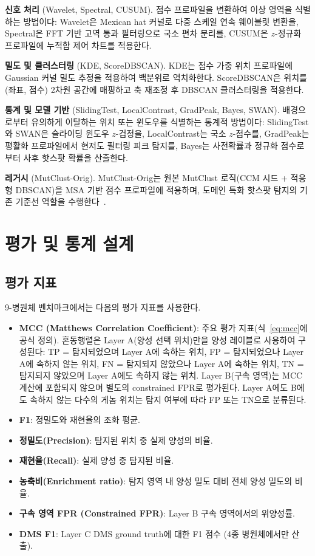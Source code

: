 \textbf{신호 처리} (Wavelet, Spectral, CUSUM).
점수 프로파일을 변환하여 이상 영역을 식별하는 방법이다: Wavelet은 Mexican hat 커널로 다중 스케일 연속 웨이블릿 변환을, Spectral은 FFT 기반 고역 통과 필터링으로 국소 편차 분리를, CUSUM은 $z$-정규화 프로파일에 누적합 제어 차트를 적용한다.

\textbf{밀도 및 클러스터링} (KDE, ScoreDBSCAN).
KDE는 점수 가중 위치 프로파일에 Gaussian 커널 밀도 추정을 적용하여 백분위로 역치화한다. ScoreDBSCAN은 위치를 (좌표, 점수) 2차원 공간에 매핑하고 축 재조정 후 DBSCAN 클러스터링을 적용한다.

\textbf{통계 및 모델 기반} (SlidingTest, LocalContrast, GradPeak, Bayes, SWAN).
배경으로부터 유의하게 이탈하는 위치 또는 윈도우를 식별하는 통계적 방법이다: SlidingTest와 SWAN은 슬라이딩 윈도우 $z$-검정을, LocalContrast는 국소 $z$-점수를, GradPeak는 평활화 프로파일에서 현저도 필터링 피크 탐지를, Bayes는 사전확률과 정규화 점수로부터 사후 핫스팟 확률을 산출한다.

\textbf{레거시} (MutClust-Orig).
MutClust-Orig는 원본 MutClust 로직(CCM 시드 + 적응형 DBSCAN)을 MSA 기반 점수 프로파일에 적용하며, 도메인 특화 핫스팟 탐지의 기존 기준선 역할을 수행한다~\cite{youn2025mutclust}.

\section{평가 및 통계 설계}
\label{sec:eval_stat_design_kr}

\subsection{평가 지표}
\label{subsec:9pathogen_metrics}

9-병원체 벤치마크에서는 다음의 평가 지표를 사용한다.

\begin{itemize}
\item \textbf{MCC (Matthews Correlation Coefficient)}: 주요 평가 지표(식~\ref{eq:mcc}에 공식 정의).
혼동행렬은 Layer A(양성 선택 위치)만을 양성 레이블로 사용하여 구성된다: TP = 탐지되었으며 Layer A에 속하는 위치, FP = 탐지되었으나 Layer A에 속하지 않는 위치, FN = 탐지되지 않았으나 Layer A에 속하는 위치, TN = 탐지되지 않았으며 Layer A에도 속하지 않는 위치.
Layer B(구속 영역)는 MCC 계산에 포함되지 않으며 별도의 constrained FPR로 평가된다. Layer A에도 B에도 속하지 않는 다수의 게놈 위치는 탐지 여부에 따라 FP 또는 TN으로 분류된다.
\item \textbf{F1}: 정밀도와 재현율의 조화 평균.
\item \textbf{정밀도(Precision)}: 탐지된 위치 중 실제 양성의 비율.
\item \textbf{재현율(Recall)}: 실제 양성 중 탐지된 비율.
\item \textbf{농축비(Enrichment ratio)}: 탐지 영역 내 양성 밀도 대비 전체 양성 밀도의 비율.
\item \textbf{구속 영역 FPR (Constrained FPR)}: Layer B 구속 영역에서의 위양성률.
\item \textbf{DMS F1}: Layer C DMS ground truth에 대한 F1 점수 (4종 병원체에서만 산출).
\end{itemize}

